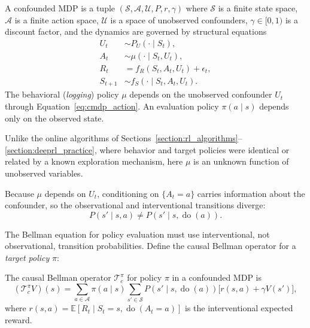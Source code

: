 \begin{definition}
\label{def:confounded_mdp}
A confounded MDP is a tuple $(\mathcal{S}, \mathcal{A}, \mathcal{U}, P, r, \gamma)$ where $\mathcal{S}$ is a finite state space, $\mathcal{A}$ is a finite action space, $\mathcal{U}$ is a space of unobserved confounders, $\gamma \in [0,1)$ is a discount factor, and the dynamics are governed by structural equations
\begin{align}
U_t &\sim P_U(\cdot \mid S_t), \label{eq:cmdp_confounder} \\
A_t &\sim \mu(\cdot \mid S_t, U_t), \label{eq:cmdp_action} \\
R_t &= f_R(S_t, A_t, U_t) + \epsilon_t, \label{eq:cmdp_reward} \\
S_{t+1} &\sim f_S(\cdot \mid S_t, A_t, U_t). \label{eq:cmdp_transition}
\end{align}
The behavioral (\textit{logging}) policy $\mu$ depends on the unobserved confounder $U_t$ through Equation~\eqref{eq:cmdp_action}. An evaluation policy $\pi(a \mid s)$ depends only on the observed state.
\end{definition}

Unlike the online algorithms of Sections~\ref{section:rl_algorithms}--\ref{section:deeprl_practice}, where behavior and target policies were identical or related by a known exploration mechanism, here $\mu$ is an unknown function of unobserved variables.

Because $\mu$ depends on $U_t$, conditioning on $\{A_t = a\}$ carries information about the confounder, so the observational and interventional transitions diverge:
\begin{equation}
P(s' \mid s, a) \neq P(s' \mid s, \operatorname{do}(a)).
\label{eq:obs_vs_interventional}
\end{equation}

The Bellman equation for policy evaluation must use interventional, not observational, transition probabilities. Define the causal Bellman operator for a \textit{target policy} $\pi$:

\begin{definition}
\label{def:causal_bellman}
The causal Bellman operator $\mathcal{T}_c^\pi$ for policy $\pi$ in a confounded MDP is
\begin{equation}
(\mathcal{T}_c^\pi V)(s) = \sum_{a \in \mathcal{A}} \pi(a \mid s) \sum_{s' \in \mathcal{S}} P(s' \mid s, \operatorname{do}(a)) \bigl[ r(s, a) + \gamma V(s') \bigr],
\label{eq:causal_bellman}
\end{equation}
where $r(s,a) = \mathbb{E}[R_t \mid S_t = s, \operatorname{do}(A_t = a)]$ is the interventional expected reward.
\end{definition}

